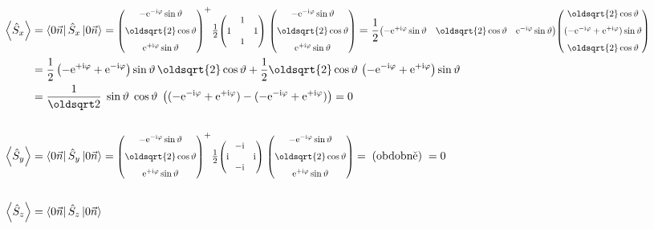 \documentclass[10pt,a4paper]{article}
\newcommand{\const}[1]{\text{#1}}
\newcommand{\expect}[1]{\left< #1 \right>}
\newcommand{\mat}[1]{
    \begin{pmatrix}
        #1
    \end{pmatrix}
}
\newcommand{\smat}[2][1]{
    \scalebox{#1}{$\mat{#2}$}
}
\newcommand{\bra}[1]{\left< #1 \right|}
\newcommand{\ket}[1]{\left| #1 \right>}
\newcommand{\e}[1]{\const{e}^{#1}}
\renewcommand{\i}{\const{i}}
\def\1{\mathbbm{1}}
\begin{document}
\begin{align*}
    \expect{\hat S_x}
    &= \bra{0\vec n} \hat S_x \ket{0\vec n}
    =
    \smat[0.8]{
        -\e{-\i \varphi} \sin \vartheta \\[7pt]
        \oldsqrt{2} \cos \vartheta \\[7pt]
        \e{+\i \varphi} \sin \vartheta
    }^+
    \tfrac{1}{2} \smat[0.8]{&1&\\1&&1\\&1} \;
    \smat[0.8]{
        -\e{-\i \varphi} \sin \vartheta \\[7pt]
        \oldsqrt{2} \cos \vartheta \\[7pt]
        \e{+\i \varphi} \sin \vartheta
    }
    =
    \frac{1}{2}
    \smat[0.8]{
        -\e{+\i \varphi} \sin \vartheta &
        \oldsqrt{2} \cos \vartheta &
        \e{-\i \varphi} \sin \vartheta
    }
    \smat[0.8]{
        \oldsqrt{2} \cos \vartheta \\[7pt]
        (-\e{-\i\varphi} + \e{+\i\varphi}) \sin \vartheta \\[7pt]
        \oldsqrt{2} \cos \vartheta
    }
    \\
    &=
    \frac{1}{2}
    \left(-\e{+\i\varphi} + \e{-\i\varphi}\right)
    \sin \vartheta \,
    \oldsqrt{2} \cos \vartheta
    +
    \frac{1}{2}
    \oldsqrt{2} \cos \vartheta \,
    \left(-\e{-\i\varphi} + \e{+\i\varphi}\right)
    \sin \vartheta
    \\
    &=
    \frac{1}{\oldsqrt 2} \;
    \sin \vartheta \;
    \cos \vartheta \;
    \left(
        (-\e{-\i\varphi} + \e{+\i\varphi}) -
        (-\e{-\i\varphi} + \e{+\i\varphi})
    \right)
    = 0
    \\\\
    \expect{\hat S_y}
    &= \bra{0\vec n} \hat S_y \ket{0\vec n}
    =
    \smat[0.8]{
        -\e{-\i \varphi} \sin \vartheta \\[7pt]
        \oldsqrt{2} \cos \vartheta \\[7pt]
        \e{+\i \varphi} \sin \vartheta
    }^+
    \tfrac{1}{2} \smat[0.8]{&\!\!-\i&\\\i&&\i\\&\!\!-\i} \;
    \smat[0.8]{
        -\e{-\i \varphi} \sin \vartheta \\[7pt]
        \oldsqrt{2} \cos \vartheta \\[7pt]
        \e{+\i \varphi} \sin \vartheta
    }
    = \; \text{(obdobně)} \; = 0
    \\\\
    \expect{\hat S_z}
    &= \bra{0\vec n} \hat S_z \ket{0\vec n}

\end{align*}
\end{document}

